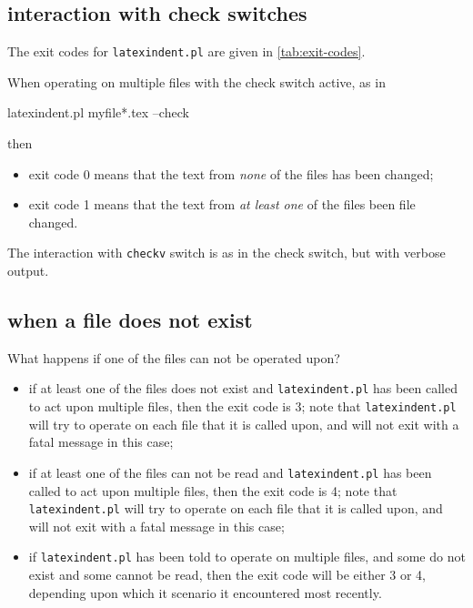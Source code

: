  \subsection{interaction with check switches}
  The exit codes for \texttt{latexindent.pl} are given in \vref{tab:exit-codes}.

  When operating on multiple files with the check switch active, as in

  \begin{commandshell}
latexindent.pl myfile*.tex --check
        \end{commandshell}

  then
  \begin{itemize}
   \item exit code 0 means that the text from \emph{none} of the files has been changed;
   \item exit code 1 means that the text from \emph{at least one} of the files been file changed.
  \end{itemize}

  The interaction with \texttt{checkv} switch is as in the check switch, but with verbose
  output.

 \subsection{when a file does not exist}
  What happens if one of the files can not be operated upon?
  \begin{itemize}
   \item if at least one of the files does not exist and \texttt{latexindent.pl} has been called
         to act upon multiple files, then the exit code is 3; note that \texttt{latexindent.pl}
         will try to operate on each file that it is called upon, and will not exit with a fatal
         message in this case;
   \item if at least one of the files can not be read and \texttt{latexindent.pl} has been called
         to act upon multiple files, then the exit code is 4; note that \texttt{latexindent.pl}
         will try to operate on each file that it is called upon, and will not exit with a fatal
         message in this case;
   \item if \texttt{latexindent.pl} has been told to operate on multiple files, and some do not
         exist and some cannot be read, then the exit code will be either 3 or 4, depending upon
         which it scenario it encountered most recently.
  \end{itemize}

